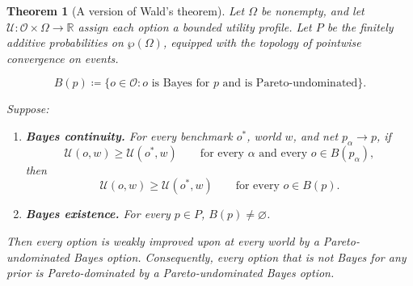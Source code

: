 \documentclass[11pt]{article}
\newtheorem{theorem}{Theorem}[section]
\theoremstyle{definition}
\theoremstyle{remark}
\newcommand{\U}{\mathcal U}
\begin{document}
\begin{theorem}[A version of Wald's theorem]
	Let $\Omega$ be nonempty, and let
	$\U\colon\mathcal O\times\Omega\to\mathbb R$
	assign each option a bounded utility profile.
	Let $P$ be the finitely additive probabilities
	on $\wp(\Omega)$, equipped with the topology
	of pointwise convergence on events.
	
	\[
	B(p)
	\coloneqq
	\{o\in\mathcal O:
	o\text{ is Bayes for }p
	\text{ and is Pareto-undominated}\}.
	\]

	
	Suppose:
	\begin{enumerate}
		
		\item \textbf{Bayes continuity.}
		For every benchmark $o^*$, world $w$, and net
		$p_\alpha\to p$, if
		\[
		\U(o,w)\ge\U(o^*,w)
		\qquad
		\text{for every $\alpha$ and every }
		o\in B(p_\alpha),
		\]
		then
		\[
		\U(o,w)\ge\U(o^*,w)
		\qquad
		\text{for every }o\in B(p).
		\]
		
		\item \textbf{Bayes existence.}
		For every $p\in P$,
		$B(p)\neq\varnothing$.
	\end{enumerate}
	
	Then every option is weakly improved upon at
	every world by a Pareto-undominated Bayes option.
	Consequently, every option that is not Bayes
	for any prior is Pareto-dominated by a
	Pareto-undominated Bayes option.
\end{theorem}
\end{document}

